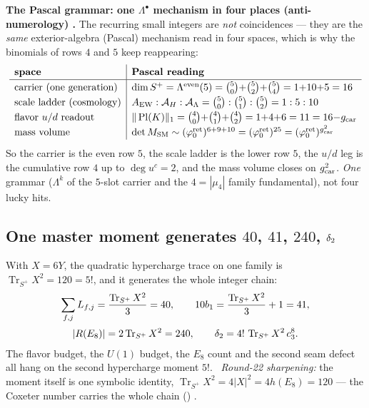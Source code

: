 \par\smallskip\noindent\textbf{The Pascal grammar: one $\Lambda^\bullet$ mechanism in four places (anti-numerology) \mE.}
The recurring small integers are \emph{not} coincidences --- they are the \emph{same} exterior-algebra
(Pascal) mechanism read in four spaces, which is why the binomials of rows $4$ and $5$ keep reappearing:
\[
  \renewcommand{\arraystretch}{1.25}
  \begin{array}{l|l}
  \textbf{space} & \textbf{Pascal reading}\\\hline
  \text{carrier (one generation)} & \dim S^+=\Lambda^{\mathrm{even}}(5)=\tbinom50{+}\tbinom52{+}\tbinom54=1{+}10{+}5=16\\
  \text{scale ladder (cosmology)} & \AEW:\AH:\AL=\tbinom50:\tbinom51:\tbinom52=1:5:10\\
  \text{flavor } u/d\text{ readout} & \|\operatorname{Pl}(K)\|_1=\tbinom40{+}\tbinom41{+}\tbinom42=1{+}4{+}6=11=16{-}\gcar\\
  \text{mass volume} & \det M_{\mathrm{SM}}\sim(\phiz)^{6+9+10}=(\phiz)^{25}=(\phiz)^{\gcar^2}\\
  \end{array}
\]
So the carrier is the even row $5$, the scale ladder is the lower row $5$, the $u/d$ leg is the cumulative
row $4$ up to $\deg u^c=2$, and the mass volume closes on $g_{\mathrm{car}}^2$. \emph{One} grammar
($\Lambda^k$ of the $5$-slot carrier and the $4=|\mu_4|$ family fundamental), not four lucky hits.
\,\allowbreak{}\,\allowbreak{}
\par\smallskip

\subsection{One master moment generates $40$, $41$, $240$, $\delta_2$}
With $X=6Y$, the quadratic hypercharge trace on one family is $\operatorname{Tr}_{S^+}X^2=120=5!$,
and it generates the whole integer chain:
\begin{equation}
\begin{gathered}
  \sum_{f,j}L_{f,j}=\frac{\operatorname{Tr}_{S^+}X^2}{3}=40,\qquad
  10b_1=\frac{\operatorname{Tr}_{S^+}X^2}{3}+1=41,\\[2pt]
  |R(E_8)|=2\operatorname{Tr}_{S^+}X^2=240,\qquad
  \delta_2=4!\,\operatorname{Tr}_{S^+}X^2\,c_3^8 .
\end{gathered}
\end{equation}
The flavor budget, the $U(1)$ budget, the $E_8$ count and the second seam defect all hang on the
second hypercharge moment $5!$. \mE\ \emph{Round-22 sharpening:} the moment itself is one symbolic
identity, $\operatorname{Tr}_{S^+}X^2=4|X|^2=4h(E_8)=120$ --- the Coxeter number carries the whole
chain () \mE.

